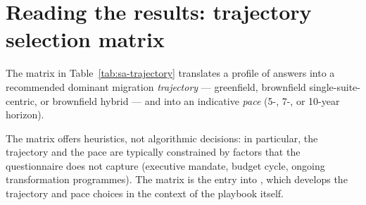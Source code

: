 \section{Reading the results: trajectory selection matrix}
\label{sec:sa-results}

The matrix in Table~\ref{tab:sa-trajectory} translates a profile of
answers into a recommended dominant migration \emph{trajectory} ---
greenfield, brownfield single-suite-centric, or brownfield hybrid --- and
into an indicative \emph{pace} (5-, 7-, or 10-year horizon).

The matrix offers heuristics, not algorithmic decisions: in particular,
the trajectory and the pace are typically constrained by factors that
the questionnaire does not capture (executive mandate, budget cycle,
ongoing transformation programmes). The matrix is the entry into
, which develops the trajectory and pace
choices in the context of the playbook itself.

